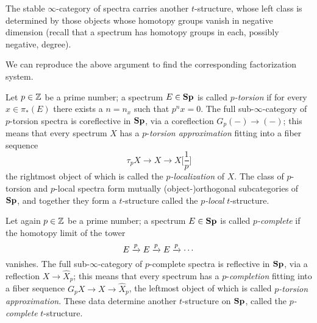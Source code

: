 \begin{example}
The stable $\infty$\hyp{}category of spectra carries another $t$\hyp{}structure, whose left class is determined by those objects whose homotopy groups vanish in negative dimension (recall that a spectrum has homotopy groups in each, possibly negative, degree).

We can reproduce the above argument to find the corresponding factorization system.
\end{example}
\begin{example}\label{p.compl.p.loc}
Let $p\in\mathbb{Z}$ be a prime number; a spectrum $E\in\mathbf{Sp}$ is called \emph{$p$\hyp{}torsion} if for every $x\in\pi_*(E)$ there exists a $n = n_x$ such that $p^n x = 0$. The full sub\hyp{}$\infty$\hyp{}category of $p$\hyp{}torsion spectra is coreflective in $\mathbf{Sp}$, via a coreflection $G_p(-)\to (-)$; this means that every spectrum $X$ has a $p$\hyp{}\emph{torsion approximation} fitting into a fiber sequence
\[
\tau_pX \to X \to \textstyle X\big[\frac{1}{p}\big]
\]
the rightmost object of which is called the \emph{$p$\hyp{}localization} of $X$. The class of $p$\hyp{}torsion and $p$\hyp{}local spectra form mutually (object\hyp{})orthogonal subcategories of $\mathbf{Sp}$, and together they form a $t$\hyp{}structure called the \emph{$p$\hyp{}local} $t$\hyp{}structure.

Let again $p\in\mathbb{Z}$ be a prime number; a spectrum $E\in\mathbf{Sp}$ is called \emph{$p$\hyp{}complete} if the homotopy limit of the tower
\[
E \xrightarrow{p}E \xrightarrow{p}E \xrightarrow{p}\cdots
\]
vanishes. The full sub\hyp{}$\infty$\hyp{}category of $p$\hyp{}complete spectra is reflective in $\mathbf{Sp}$, via a reflection $X\to \widehat{X}_p$; this means that every spectrum has a $p$\hyp{}\emph{completion} fitting into a fiber sequence $G_{p}X\to X\to \widehat{X}_p$, the leftmost object of which is called \emph{$p$\hyp{}torsion approximation}. These data determine another $t$\hyp{}structure on $\mathbf{Sp}$, called the \emph{$p$\hyp{}complete} $t$\hyp{}structure.


\end{example}
